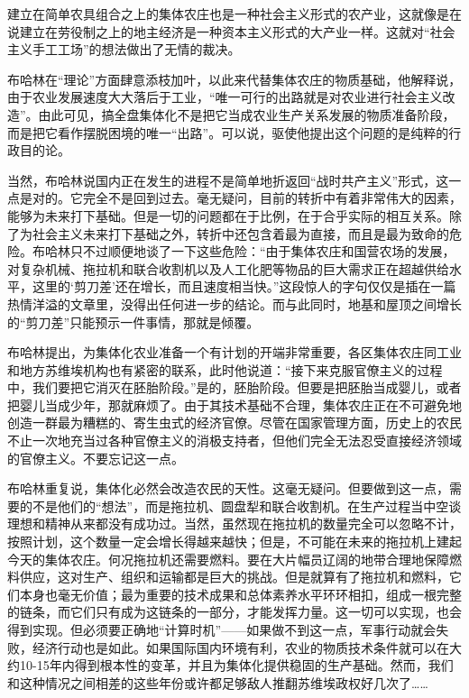 \documentclass[UTF8, 12pt, a4paper]{ctexrep}
\begin{document}
建立在简单农具组合之上的集体农庄也是一种社会主义形式的农产业，这就像是在说建立在劳役制之上的地主经济是一种资本主义形式的大产业一样。这就对“社会主义手工工场”的想法做出了无情的裁决。

布哈林在“理论”方面肆意添枝加叶，以此来代替集体农庄的物质基础，他解释说，由于农业发展速度大大落后于工业，“唯一可行的出路就是对农业进行社会主义改造”。由此可见，搞全盘集体化不是把它当成农业生产关系发展的物质准备阶段，而是把它看作摆脱困境的唯一“出路”。可以说，驱使他提出这个问题的是纯粹的行政目的论。

当然，布哈林说国内正在发生的进程不是简单地折返回“战时共产主义”形式，这一点是对的。它完全不是回到过去。毫无疑问，目前的转折中有着非常伟大的因素，能够为未来打下基础。但是一切的问题都在于比例，在于合乎实际的相互关系。除了为社会主义未来打下基础之外，转折中还包含着最为直接，而且是最为致命的危险。布哈林只不过顺便地谈了一下这些危险：“由于集体农庄和国营农场的发展，对复杂机械、拖拉机和联合收割机以及人工化肥等物品的巨大需求正在超越供给水平，这里的‘剪刀差’还在增长，而且速度相当快。”这段惊人的字句仅仅是插在一篇热情洋溢的文章里，没得出任何进一步的结论。而与此同时，地基和屋顶之间增长的“剪刀差”只能预示一件事情，那就是倾覆。

布哈林提出，为集体化农业准备一个有计划的开端非常重要，各区集体农庄同工业和地方苏维埃机构也有紧密的联系，此时他说道：“接下来克服官僚主义的过程中，我们要把它消灭在胚胎阶段。”是的，胚胎阶段。但要是把胚胎当成婴儿，或者把婴儿当成少年，那就麻烦了。由于其技术基础不合理，集体农庄正在不可避免地创造一群最为糟糕的、寄生虫式的经济官僚。尽管在国家管理方面，历史上的农民不止一次地充当过各种官僚主义的消极支持者，但他们完全无法忍受直接经济领域的官僚主义。不要忘记这一点。

布哈林重复说，集体化必然会改造农民的天性。这毫无疑问。但要做到这一点，需要的不是他们的“想法”，而是拖拉机、圆盘犁和联合收割机。在生产过程当中空谈理想和精神从来都没有成功过。当然，虽然现在拖拉机的数量完全可以忽略不计，按照计划，这个数量一定会增长得越来越快；但是，不可能在未来的拖拉机上建起今天的集体农庄。何况拖拉机还需要燃料。要在大片幅员辽阔的地带合理地保障燃料供应，这对生产、组织和运输都是巨大的挑战。但是就算有了拖拉机和燃料，它们本身也毫无价值；最为重要的技术成果和总体素养水平环环相扣，组成一根完整的链条，而它们只有成为这链条的一部分，才能发挥力量。这一切可以实现，也会得到实现。但必须要正确地“计算时机”——如果做不到这一点，军事行动就会失败，经济行动也是如此。如果国际国内环境有利，农业的物质技术条件就可以在大约10-15年内得到根本性的变革，并且为集体化提供稳固的生产基础。然而，我们和这种情况之间相差的这些年份或许都足够敌人推翻苏维埃政权好几次了……
\end{document}
